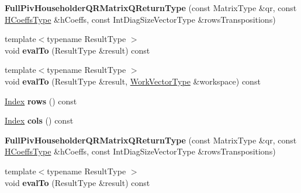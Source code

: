 \begin{DoxyCompactItemize}
\item 
\mbox{\label{group___q_r___module_a37a27f976a5e2b582e6e02e7c409afc9}} 
{\bfseries Full\+Piv\+Householder\+Q\+R\+Matrix\+Q\+Return\+Type} (const Matrix\+Type \&qr, const \hyperlink{class_eigen_1_1internal_1_1_tensor_lazy_evaluator_writable}{H\+Coeffs\+Type} \&h\+Coeffs, const Int\+Diag\+Size\+Vector\+Type \&rows\+Transpositions)
\item 
\mbox{\label{group___q_r___module_a6d2495b5c87313fe23aa1ab32524d359}} 
{\footnotesize template$<$typename Result\+Type $>$ }\\void {\bfseries eval\+To} (Result\+Type \&result) const
\item 
\mbox{\label{group___q_r___module_aeca3ef83807e4dd6b4fdc73ac20dc000}} 
{\footnotesize template$<$typename Result\+Type $>$ }\\void {\bfseries eval\+To} (Result\+Type \&result, \hyperlink{group___core___module_class_eigen_1_1_matrix}{Work\+Vector\+Type} \&workspace) const
\item 
\mbox{\label{group___q_r___module_a33656ee221422a3800edf363c72994d4}} 
\hyperlink{namespace_eigen_a62e77e0933482dafde8fe197d9a2cfde}{Index} {\bfseries rows} () const
\item 
\mbox{\label{group___q_r___module_ada880345139442a6e5a51ccd4dd2bf09}} 
\hyperlink{namespace_eigen_a62e77e0933482dafde8fe197d9a2cfde}{Index} {\bfseries cols} () const
\item 
\mbox{\label{group___q_r___module_a37a27f976a5e2b582e6e02e7c409afc9}} 
{\bfseries Full\+Piv\+Householder\+Q\+R\+Matrix\+Q\+Return\+Type} (const Matrix\+Type \&qr, const \hyperlink{class_eigen_1_1internal_1_1_tensor_lazy_evaluator_writable}{H\+Coeffs\+Type} \&h\+Coeffs, const Int\+Diag\+Size\+Vector\+Type \&rows\+Transpositions)
\item 
\mbox{\label{group___q_r___module_a6d2495b5c87313fe23aa1ab32524d359}} 
{\footnotesize template$<$typename Result\+Type $>$ }\\void {\bfseries eval\+To} (Result\+Type \&result) const

\end{DoxyCompactItemize}
